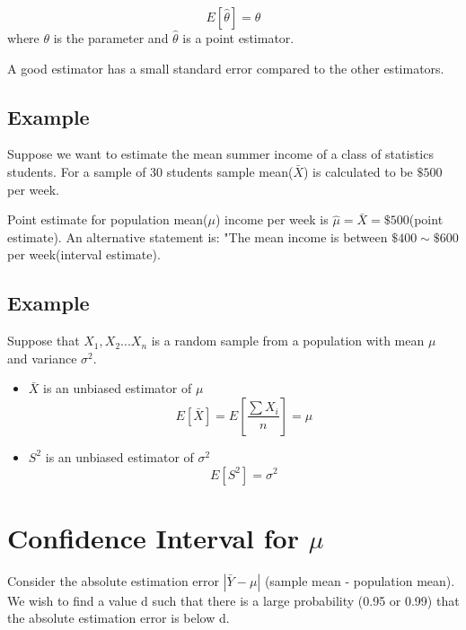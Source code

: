 \documentclass{article}
\begin{document}
    \begin{equation*}
        E[\hat{\theta}] = \theta
    \end{equation*}
    where $\theta$ is the parameter and $\hat{\theta}$ is a point estimator.\par

    A good estimator has a small standard error compared to the other estimators.\par

    \subsection*{Example}
    Suppose we want to estimate the mean summer income of a class of statistics students.
    For a sample of 30 students sample mean($\bar{X}$) is calculated to be $\$500$ per week.\par

    Point estimate for population mean($\mu$) income per week is $\hat{\mu} = \bar{X} = \$500$(point estimate).
    An alternative statement is: "The mean income is between $\$400 \sim \$600$ per week(interval estimate).

    \subsection*{Example}
    Suppose that $X_{1} , X_{2}... X_{n}$ is a random sample from a population with mean $\mu$
    and variance $\sigma^{2}$.\par
   
    \begin{itemize}
        \item $\bar{X}$ is an unbiased estimator of $\mu$
            \begin{equation*}
                E[\bar{X}] = E[\frac{\sum{X_{i}}}{n}] = \mu
            \end{equation*}
        \item $S^{2}$ is an unbiased estimator of $\sigma^{2}$
        \begin{equation*}
            E[S^{2}]  = \sigma^{2}
        \end{equation*}
    \end{itemize}

    \section*{Confidence Interval for $\mu$}
    Consider the absolute estimation error $|\bar{Y} - \mu|$ (sample mean - population mean). 
    We wish to find a value d such that there is a large probability (0.95 or 0.99) that the absolute estimation 
    error is below d.
\end{document}

